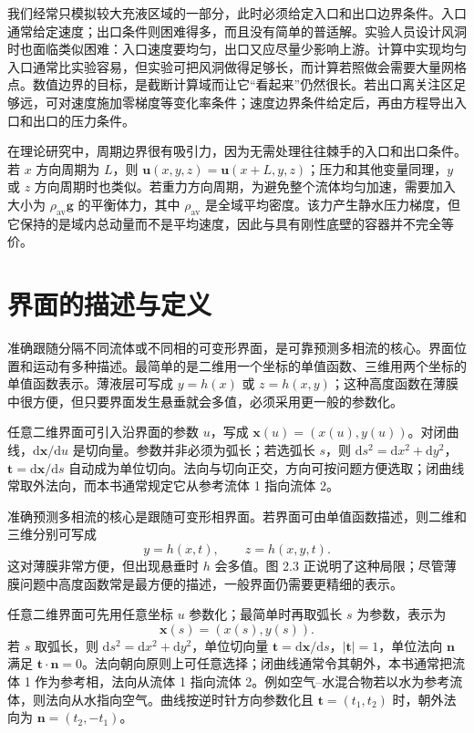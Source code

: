 \documentclass[11pt,a4paper,openany,fontset=none]{ctexbook}
\newenvironment{sourceblock}
  {\par\addvspace{0.65\baselineskip}\noindent\begin{minipage}{\linewidth}\centering}
  {\end{minipage}\par\addvspace{0.48\baselineskip}}
\begin{document}
我们经常只模拟较大充液区域的一部分，此时必须给定入口和出口边界条件。入口通常给定速度；出口条件则困难得多，而且没有简单的普适解。实验人员设计风洞时也面临类似困难：入口速度要均匀，出口又应尽量少影响上游。计算中实现均匀入口通常比实验容易，但实验可把风洞做得足够长，而计算若照做会需要大量网格点。数值边界的目标，是截断计算域而让它“看起来”仍然很长。若出口离关注区足够远，可对速度施加零梯度等变化率条件；速度边界条件给定后，再由方程导出入口和出口的压力条件。

在理论研究中，周期边界很有吸引力，因为无需处理往往棘手的入口和出口条件。若 $x$ 方向周期为 $L$，则 $\bm u(x,y,z)=\bm u(x+L,y,z)$；压力和其他变量同理，$y$ 或 $z$ 方向周期时也类似。若重力方向周期，为避免整个流体均匀加速，需要加入大小为 $\rho_{\mathrm{av}}\bm g$ 的平衡体力，其中 $\rho_{\mathrm{av}}$ 是全域平均密度。该力产生静水压力梯度，但它保持的是域内总动量而不是平均速度，因此与具有刚性底壁的容器并不完全等价。

\section{界面的描述与定义}

准确跟随分隔不同流体或不同相的可变形界面，是可靠预测多相流的核心。界面位置和运动有多种描述。最简单的是二维用一个坐标的单值函数、三维用两个坐标的单值函数表示。薄液层可写成 $y=h(x)$ 或 $z=h(x,y)$；这种高度函数在薄膜中很方便，但只要界面发生悬垂就会多值，必须采用更一般的参数化。

任意二维界面可引入沿界面的参数 $u$，写成 $\bm x(u)=(x(u),y(u))$。对闭曲线，$\mathrm d\bm x/\mathrm du$ 是切向量。参数并非必须为弧长；若选弧长 $s$，则 $\mathrm ds^2=\mathrm dx^2+\mathrm dy^2$，$\bm t=\mathrm d\bm x/\mathrm ds$ 自动成为单位切向。法向与切向正交，方向可按问题方便选取；闭曲线常取外法向，而本书通常规定它从参考流体 1 指向流体 2。


准确预测多相流的核心是跟随可变形相界面。若界面可由单值函数描述，则二维和三维分别可写成
\begin{equation}
 y=h(x,t),\qquad z=h(x,y,t). \tag{2.26}
\end{equation}
这对薄膜非常方便，但出现悬垂时 $h$ 会多值。图 2.3 正说明了这种局限；尽管薄膜问题中高度函数常是最方便的描述，一般界面仍需要更精细的表示。

\begin{sourceblock}
\end{sourceblock}

任意二维界面可先用任意坐标 $u$ 参数化；最简单时再取弧长 $s$ 为参数，表示为
\begin{equation}
 \bm x(s)=(x(s),y(s)). \tag{2.27}
\end{equation}
若 $s$ 取弧长，则 $\mathrm ds^2=\mathrm dx^2+\mathrm dy^2$，单位切向量 $\bm t=\mathrm d\bm x/\mathrm ds$，$|\bm t|=1$，单位法向 $\bm n$ 满足 $\bm t\cdot\bm n=0$。法向朝向原则上可任意选择；闭曲线通常令其朝外，本书通常把流体 1 作为参考相，法向从流体 1 指向流体 2。例如空气--水混合物若以水为参考流体，则法向从水指向空气。曲线按逆时针方向参数化且 $\bm t=(t_1,t_2)$ 时，朝外法向为 $\bm n=(t_2,-t_1)$。
\end{document}
